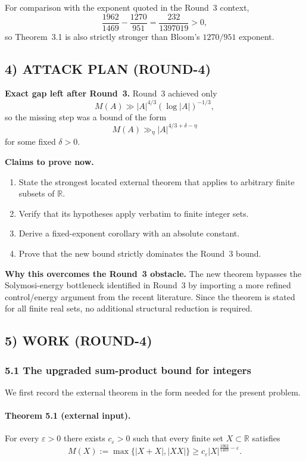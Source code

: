 For comparison with the exponent quoted in the Round~3 context,
\[
\frac{1962}{1469}-\frac{1270}{951}
=\frac{232}{1397019}>0,
\]
so Theorem~3.1 is also strictly stronger than Bloom's $1270/951$ exponent.

\subsection{4) ATTACK PLAN (ROUND-4)}
\textbf{Exact gap left after Round~3.} Round~3 achieved only
\[
M(A)\gg |A|^{4/3}(\log|A|)^{-1/3},
\]
so the missing step was a bound of the form
\[
M(A)\gg_{\eta}|A|^{4/3+\delta-\eta}
\]
for some fixed $\delta>0$.

\textbf{Claims to prove now.}
\begin{enumerate}
\item[(i)] State the strongest located external theorem that applies to arbitrary finite subsets of $\mathbb R$.
\item[(ii)] Verify that its hypotheses apply verbatim to finite integer sets.
\item[(iii)] Derive a fixed-exponent corollary with an absolute constant.
\item[(iv)] Prove that the new bound strictly dominates the Round~3 bound.
\end{enumerate}

\textbf{Why this overcomes the Round~3 obstacle.} The new theorem bypasses the Solymosi-energy bottleneck identified in Round~3 by importing a more refined control/energy argument from the recent literature. Since the theorem is stated for all finite real sets, no additional structural reduction is required.

\subsection{5) WORK (ROUND-4)}
\subsubsection{5.1 The upgraded sum-product bound for integers}
We first record the external theorem in the form needed for the present problem.

\paragraph{Theorem 5.1 (external input).}
For every $\varepsilon>0$ there exists $c_{\varepsilon}>0$ such that every finite set $X\subset\mathbb R$ satisfies
\[
M(X):=\max\{|X+X|,|XX|\}\ge c_{\varepsilon}|X|^{\frac{1962}{1469}-\varepsilon}.
\]

